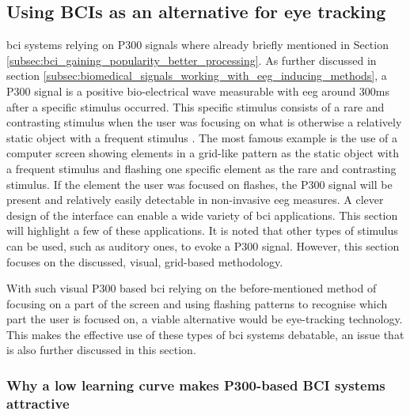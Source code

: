 
\subsection{Using BCIs as an alternative for eye tracking}
\label{subsec:bci_common_use_cases_bcis_replace_eye_tracking}

\gls{bci} systems relying on P300 signals where already briefly mentioned in Section \ref{subsec:bci_gaining_popularity_better_processing}.
As further discussed in section \ref{subsec:biomedical_signals_working_with_eeg_inducing_methods}, a P300 signal is a positive bio-electrical wave measurable with \gls{eeg} around 300ms after a specific stimulus occurred.
This specific stimulus consists of a rare and contrasting stimulus when the user was focusing on what is otherwise a relatively static object with a frequent stimulus \citep{eye_tracking_vs_p300_comparable}.
The most famous example is the use of a computer screen showing elements in a grid-like pattern as the static object with a frequent stimulus and flashing one specific element as the rare and contrasting stimulus.
If the element the user was focused on flashes, the P300 signal will be present and relatively easily detectable in non-invasive \gls{eeg} measures.
A clever design of the interface can enable a wide variety of \gls{bci} applications.
This section will highlight a few of these applications.
It is noted that other types of stimulus can be used, such as auditory ones, to evoke a P300 signal.
However, this section focuses on the discussed, visual, grid-based methodology.

With such visual P300 based \gls{bci} relying on the before-mentioned method of focusing on a part of the screen and using flashing patterns to recognise which part the user is focused on, a viable alternative would be eye-tracking technology.
This makes the effective use of these types of \gls{bci} systems debatable, an issue that is also further discussed in this section.


\subsubsection{Why a low learning curve makes P300-based BCI systems attractive}
\label{subsubsec:bci_common_use_cases_bcis_replace_eye_tracking_why_p300}

